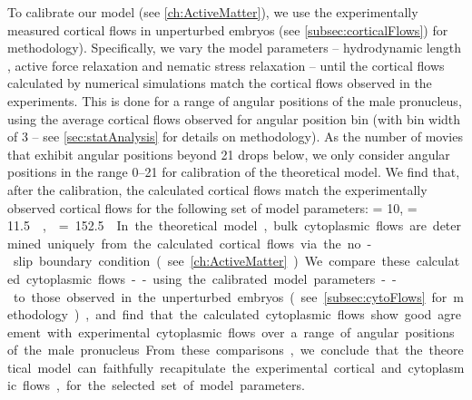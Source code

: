 To calibrate our model (see \autoref{ch:ActiveMatter}), we use the experimentally measured cortical flows in unperturbed embryos (see \autoref{subsec:corticalFlows}) for methodology). Specifically, we vary the model parameters -- hydrodynamic length \hydrodynamicLength, active force relaxation \activeRelaxLength and nematic stress relaxation \nematicLength -- until the cortical flows calculated by numerical simulations match the cortical flows observed in the experiments. This is done for a range of angular positions of the male pronucleus, using the average cortical flows observed for angular position bin (with bin width of \SI{3}{\unitAngle} -- see \autoref{sec:statAnalysis} for details on methodology). As the number of movies that exhibit angular positions beyond \SI{21}{\unitAngle} drops below, we only consider angular positions in the range \SIrange{0}{21}{\unitAngle} for calibration of the theoretical model. We find that, after the calibration, the calculated cortical flows match the experimentally observed cortical flows for the following set of model parameters: \hydrodynamicLength = \SI{10}{\unitLength}, \activeRelaxLength = \SI{11.5}{\square\unitLength\per\second}, \nematicLength = \SI{152.5}{\square\unitLength\per\second}. 

In the theoretical model, bulk cytoplasmic flows are determined uniquely from the calculated cortical flows via the no-slip boundary condition (see \autoref{ch:ActiveMatter}). We compare these calculated cytoplasmic flows -- using the calibrated model parameters -- to those observed in the unperturbed embryos (see \autoref{subsec:cytoFlows} for methodology), and find that the calculated cytoplasmic flows show good agreement with experimental cytoplasmic flows over a range of angular positions of the male pronucleus. From these comparisons, we conclude that the theoretical model can faithfully recapitulate the experimental cortical and cytoplasmic flows, for the selected set of model parameters.

